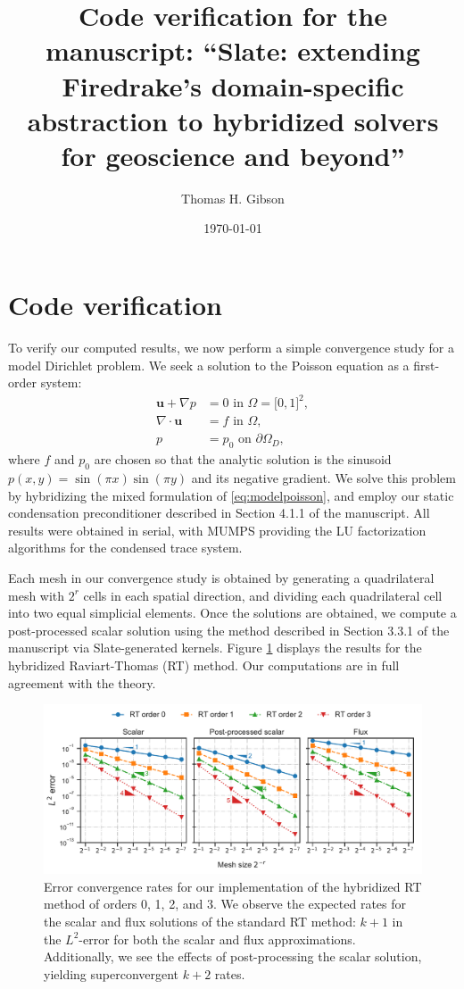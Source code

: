 \documentclass[a4paper]{article}
\title{Code verification for the manuscript:
``Slate: extending Firedrake's domain-specific abstraction to hybridized solvers for geoscience and beyond''}
\author[$\dagger$,1]{Thomas H. Gibson}
\affil[1]{Department of Mathematics, Imperial College, South Kensington Campus, London SW7 2AZ}
\affil[$\dagger$]{Email: \texttt{t.gibson15@imperial.ac.uk}}
\date{\today}
\begin{document}
\maketitle

\section{Code verification}\label{subsec:hybridpoisson}
To verify our computed results, we now perform a simple convergence study for a model Dirichlet
problem. We seek a solution to the Poisson equation as a first-order system:
\begin{align}\label{eq:modelpoisson}
	\boldsymbol{u} + \nabla p &= 0 \text{ in } \Omega = \lbrack 0, 1\rbrack^2, \\
	\nabla\cdot\boldsymbol{u} &= f \text{ in } \Omega, \\
	p &= p_0 \text{ on } \partial\Omega_D,
\end{align}
where $f$ and $p_0$ are chosen so that the analytic solution is the sinusoid
$p(x, y) = \sin(\pi x)\sin(\pi y)$ and its negative gradient. We solve this problem
by hybridizing the mixed formulation of \eqref{eq:modelpoisson},
and employ our static condensation preconditioner described in Section
4.1.1 of the manuscript. All results were obtained in serial, with MUMPS providing the
LU factorization algorithms for the condensed trace system.

Each mesh in our convergence study is obtained by generating a quadrilateral mesh with $2^r$ cells
in each spatial direction, and dividing each quadrilateral cell into two equal simplicial elements.
Once the solutions are obtained, we compute a post-processed scalar solution using the method
described in Section 3.3.1 of the manuscript
via Slate-generated kernels. Figure \ref{fig:h-rt-conv}
displays the results for the hybridized Raviart-Thomas (RT) method. Our computations are in full agreement
with the theory.
\begin{figure}[!htbp]
	\centering
	\includegraphics[width=\textwidth]{HMM/HRT-convergence}
	\caption{Error convergence rates for our implementation of the hybridized RT method of
		orders 0, 1, 2, and 3. We observe the expected rates for the scalar
		and flux solutions of the standard RT method:
		$k+1$ in the $L^2$-error for both the scalar and flux approximations.
		Additionally, we see the effects of post-processing the scalar solution, yielding
		superconvergent $k+2$ rates.}
	\label{fig:h-rt-conv}
\end{figure}
\end{document}
